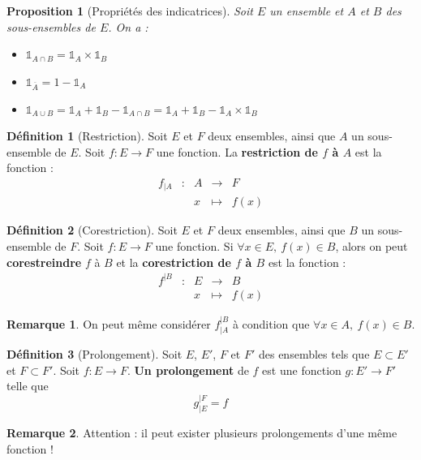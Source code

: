 \documentclass[french]{book}
\theoremstyle{plain}
\newtheorem{prop}{Proposition}[chapter]
\theoremstyle{definition}
\newtheorem{dfn}{Définition}[chapter]
\newtheorem{rmq}{Remarque}[chapter]
\theoremstyle{remark}
\begin{document}
\begin{prop}[Propriétés des indicatrices]
	Soit $E$ un ensemble et $A$ et $B$ des sous-ensembles de $E$. On a : 
	\begin{itemize}
		\item $\mathds{1}_{A\cap B}=\mathds{1}_A\times\mathds{1}_B$
		\item $\mathds{1}_{\overline{A}}=1-\mathds{1}_A$
		\item $\mathds{1}_{A\cup B}=\mathds{1}_A+\mathds{1}_B-\mathds{1}_{A\cap B}=\mathds{1}_A+\mathds{1}_B-\mathds{1}_A\times\mathds{1}_B$
	\end{itemize}
\end{prop}
\begin{dfn}[Restriction]
	Soit $E$ et $F$ deux ensembles, ainsi que $A$ un sous-ensemble de $E$. Soit $f:E\rightarrow F$ une fonction. La \textbf{restriction de $f$ à $A$} est la fonction : $$\begin{array}{ccccc}f_{|A}&:&A&\rightarrow&F\\ &&x&\mapsto&f(x)\end{array}$$
\end{dfn}
\begin{dfn}[Corestriction]
	Soit $E$ et $F$ deux ensembles, ainsi que $B$ un sous-ensemble de $F$. Soit $f:E\rightarrow F$ une fonction. Si $\forall x\in E,\ f(x)\in B$, alors on peut \textbf{corestreindre} $f$ à $B$ et la \textbf{corestriction de $f$ à $B$} est la fonction : $$\begin{array}{ccccc}f^{|B}&:&E&\rightarrow&B\\ &&x&\mapsto&f(x)\end{array}$$
\end{dfn}
\begin{rmq}
	On peut même considérer $f_{|A}^{|B}$ à condition que $\forall x\in A,\ f(x)\in B$.
\end{rmq}
\begin{dfn}[Prolongement]
	Soit $E$, $E'$, $F$ et $F'$ des ensembles tels que $E\subset E'$ et $F\subset F'$. Soit $f:E\rightarrow F$. \textbf{Un prolongement} de $f$ est une fonction $g:E'\rightarrow F'$ telle que $$g_{|E}^{|F}=f$$
\end{dfn}
\begin{rmq}
	Attention : il peut exister plusieurs prolongements d'une même fonction !
\end{rmq}
\end{document}
